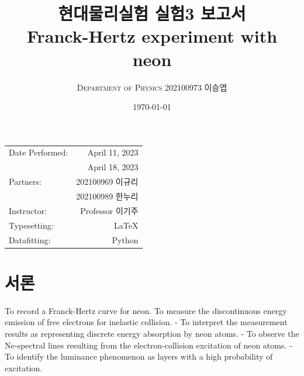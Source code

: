 \documentclass[a4paper, 10pt, nanum]{CSUniSchoolLabReport}
\title{현대물리실험 실험3 보고서 \\ Franck-Hertz experiment with neon} %
\author{\textsc{Department of Physics} 202100973 이승엽}
\date{\today}
\begin{document}
\maketitle %

\begin{center}
	\begin{tabular}{l r}
		Date Performed: & April 11, 2023 \\ %
		& April 18, 2023 \\
		Partners: & 202100969 이규리 \\ %
		& 202100989 한누리 \\
		Instructor: & Professor 이기주 \\ %
		Typesetting: & LaTeX \\
		Datafitting: & Python \\
	\end{tabular}
\end{center}


\maketitle


\section{서론}

  To record a Franck-Hertz curve for neon. To measure the discontinuous energy emission of free electrons for inelastic collision. 
- To interpret the measurement results as representing discrete energy absorption by neon 
atoms. 
- To observe the Ne-spectral lines resulting from the electron-collision excitation of neon 
atoms. 
- To identify the luminance phenomenon as layers with a high probability of excitation. 
\end{document}
